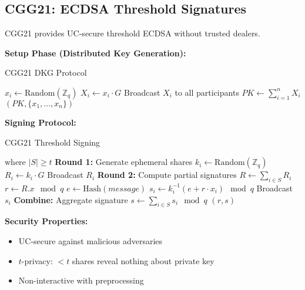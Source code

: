 \documentclass[11pt]{article}
\begin{document}
\subsection{CGG21: ECDSA Threshold Signatures}

CGG21 \cite{cgg21} provides UC-secure threshold ECDSA without trusted dealers.

\textbf{Setup Phase (Distributed Key Generation):}
\begin{algorithm}[H]
\caption{CGG21 DKG Protocol}
\begin{algorithmic}[1]
        \State $x_i \gets \text{Random}(\mathbb{Z}_q)$ 
        \State $X_i \gets x_i \cdot G$ 
        \State Broadcast $X_i$ to all participants
    \EndFor
    \State $PK \gets \sum_{i=1}^{n} X_i$ 
    \State \Return $(PK, \{x_1, \ldots, x_n\})$
\EndFunction
\end{algorithmic}
\end{algorithm}

\textbf{Signing Protocol:}
\begin{algorithm}[H]
\caption{CGG21 Threshold Signing}
\begin{algorithmic}[1]
 where $|S| \geq t$
    \State \textbf{Round 1:} Generate ephemeral shares
        \State $k_i \gets \text{Random}(\mathbb{Z}_q)$
        \State $R_i \gets k_i \cdot G$
        \State Broadcast $R_i$
    \EndFor
    \State
    \State \textbf{Round 2:} Compute partial signatures
    \State $R \gets \sum_{i \in S} R_i$
    \State $r \gets R.x \mod q$ 
    \State $e \gets \text{Hash}(message)$
        \State $s_i \gets k_i^{-1}(e + r \cdot x_i) \mod q$
        \State Broadcast $s_i$
    \EndFor
    \State
    \State \textbf{Combine:} Aggregate signature
    \State $s \gets \sum_{i \in S} s_i \mod q$
    \State \Return $(r, s)$ 
\EndFunction
\end{algorithmic}
\end{algorithm}

\textbf{Security Properties:}
\begin{itemize}
\item UC-secure against malicious adversaries
\item $t$-privacy: $< t$ shares reveal nothing about private key
\item Non-interactive with preprocessing
\end{itemize}
\end{document}
